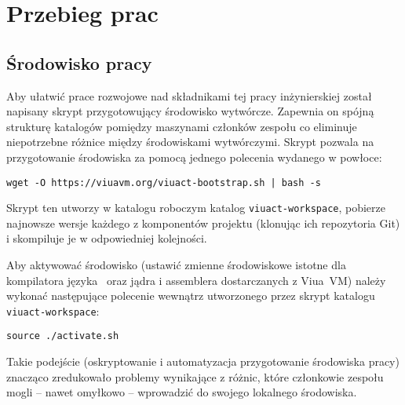 \chapter{Przebieg prac}
\label{przebieg_prac}

\section*{Środowisko pracy}

Aby ułatwić prace rozwojowe nad składnikami tej pracy inżynierskiej został
napisany skrypt przygotowujący środowisko wytwórcze. Zapewnia on spójną
strukturę katalogów pomiędzy maszynami członków zespołu co eliminuje
niepotrzebne różnice między środowiskami wytwórczymi. Skrypt pozwala na
przygotowanie środowiska za pomocą jednego polecenia wydanego w powłoce:
\begin{lstlisting}
wget -O https://viuavm.org/viuact-bootstrap.sh | bash -s
\end{lstlisting}

Skrypt ten utworzy w katalogu roboczym katalog \texttt{viuact-workspace},
pobierze najnowsze wersje każdego z komponentów projektu (klonując ich
repozytoria Git) i skompiluje je w odpowiedniej kolejności.

Aby aktywować środowisko (ustawić zmienne środowiskowe istotne dla kompilatora
języka \ViuAct\ oraz jądra i assemblera dostarczanych z Viua~VM) należy wykonać
następujące polecenie wewnątrz utworzonego przez skrypt katalogu
\texttt{viuact-workspace}:
\begin{lstlisting}
source ./activate.sh
\end{lstlisting}

Takie podejście (oskryptowanie i automatyzacja przygotowanie środowiska pracy)
znacząco zredukowało problemy wynikające z różnic, które członkowie zespołu
mogli -- nawet omyłkowo -- wprowadzić do swojego lokalnego środowiska.






